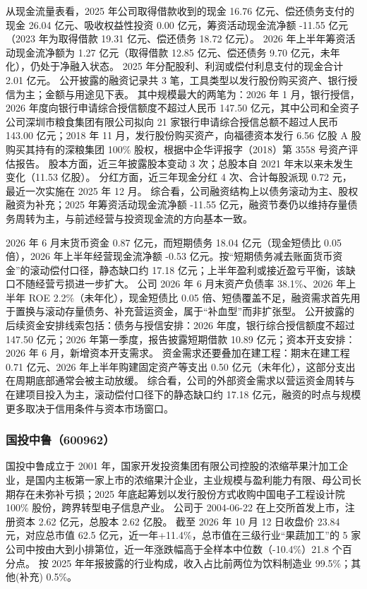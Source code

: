  从现金流量表看，2025 年公司取得借款收到的现金 16.76 亿元、偿还债务支付的现金 26.04 亿元、吸收权益性投资 0.00 亿元，筹资活动现金流净额 -11.55 亿元（2023 年为取得借款 19.31 亿元、偿还债务 18.72 亿元）。 2026 年上半年筹资活动现金流净额为 1.27 亿元（取得借款 12.85 亿元、偿还债务 9.70 亿元，未年化），仍处于净融入状态。 2025 年分配股利、利润或偿付利息支付的现金合计 2.01 亿元。 公开披露的融资记录共 3 笔，工具类型以发行股份购买资产、银行授信为主；金额与用途见下表。 其中规模最大的两笔为：2026 年 1 月，银行授信，2026 年度向银行申请综合授信额度不超过人民币 147.50 亿元，其中公司和全资子公司深圳市粮食集团有限公司拟向 21 家银行申请综合授信总额不超过人民币 143.00 亿元；2018 年 11 月，发行股份购买资产，向福德资本发行 6.56 亿股 A 股购买其持有的深粮集团 100\% 股权，根据中企华评报字（2018）第 3558 号资产评估报告。 股本方面，近三年披露股本变动 3 次；总股本自 2021 年末以来未发生变化（11.53 亿股）。 分红方面，近三年现金分红 4 次、合计每股派现 0.72 元，最近一次实施在 2025 年 12 月。 综合看，公司融资结构上以债务滚动为主、股权融资为补充；2025 年筹资活动现金流净额 -11.55 亿元，融资节奏仍以维持存量债务周转为主，与前述经营与投资现金流的方向基本一致。

 2026 年 6 月末货币资金 0.87 亿元，而短期债务 18.04 亿元（现金短债比 0.05 倍），2026 年上半年经营现金流净额 -0.53 亿元。按“短期债务减去账面货币资金”的滚动偿付口径，静态缺口约 17.18 亿元；上半年盈利或接近盈亏平衡，该缺口不随经营亏损进一步扩大。 公司 2026 年 6 月末资产负债率 38.1\%、2026 年上半年 ROE 2.2\%（未年化），现金短债比 0.05 倍、短债覆盖不足，融资需求首先用于置换与滚动存量债务、补充营运资金，属于“补血型”而非扩张型。 公开披露的后续资金安排线索包括：债务与授信安排：2026 年度，银行综合授信额度不超过 147.50 亿元；2026 年第一季度，报告披露短期借款 10.89 亿元；资本开支安排：2026 年 6 月，新增资本开支需求。 资金需求还要叠加在建工程：期末在建工程 0.71 亿元、2026 年上半年购建固定资产等支出 0.50 亿元（未年化），这部分支出在周期底部通常会被主动放缓。 综合看，公司的外部资金需求以营运资金周转与在建项目投入为主，滚动偿付口径下的静态缺口约 17.18 亿元，融资的时点与规模更多取决于信用条件与资本市场窗口。




\subsubsection{国投中鲁（600962）}
\label{co:600962}

 国投中鲁成立于 2001 年，国家开发投资集团有限公司控股的浓缩苹果汁加工企业，是国内主板第一家上市的浓缩果汁企业，主业规模与盈利能力有限、母公司长期存在未弥补亏损；2025 年底起筹划以发行股份方式收购中国电子工程设计院 100\% 股份，跨界转型电子信息产业。 公司于 2004-06-22 在上交所首发上市，注册资本 2.62 亿元，总股本 2.62 亿股。 截至 2026 年 10 月 12 日收盘价 23.84 元，对应总市值 62.5 亿元，近一年+11.4\%，总市值在三级行业“果蔬加工”的 5 家公司中按由大到小排第位，近一年涨跌幅高于全样本中位数（-10.4\%）21.8 个百分点。 按 2025 年年报披露的行业构成，收入占比前两位为饮料制造业 99.5\%；其他(补充) 0.5\%。

